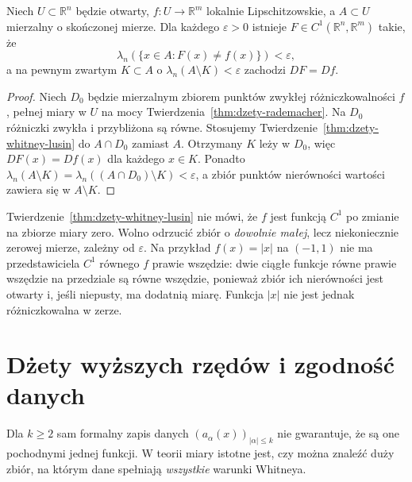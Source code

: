 \begin{wniosek}
\label{cor:dzety-lusin-lipschitz}
Niech $U\subset\mathbb R^n$ będzie otwarty,
$f:U\to\mathbb R^m$ lokalnie Lipschitzowskie,
a $A\subset U$ mierzalny o skończonej mierze.
Dla każdego $\varepsilon>0$ istnieje
$F\in C^1(\mathbb R^n,\mathbb R^m)$ takie, że
\[
 \lambda_n(\{x\in A:F(x)\ne f(x)\})<\varepsilon,
\]
a na pewnym zwartym $K\subset A$ o
$\lambda_n(A\setminus K)<\varepsilon$ zachodzi
$DF=Df$.
\end{wniosek}
\begin{proof}
Niech $D_0$ będzie mierzalnym zbiorem punktów
zwykłej różniczkowalności $f$, pełnej miary w $U$
na mocy Twierdzenia~\ref{thm:dzety-rademacher}.
Na $D_0$ różniczki zwykła i przybliżona są równe.
Stosujemy Twierdzenie~\ref{thm:dzety-whitney-lusin}
do $A\cap D_0$ zamiast $A$. Otrzymany $K$
leży w $D_0$, więc $DF(x)=Df(x)$ dla każdego
$x\in K$. Ponadto $\lambda_n(A\setminus K)
=\lambda_n((A\cap D_0)\setminus K)<\varepsilon$,
a zbiór punktów nierówności wartości zawiera się
w $A\setminus K$.
\end{proof}

\begin{uwaga}
Twierdzenie~\ref{thm:dzety-whitney-lusin} nie mówi,
że $f$ jest funkcją $C^1$ po zmianie na zbiorze miary zero.
Wolno odrzucić zbiór o \emph{dowolnie małej}, lecz niekoniecznie
zerowej mierze, zależny od $\varepsilon$.
Na przykład $f(x)=|x|$ na $(-1,1)$ nie ma
przedstawiciela $C^1$ równego $f$ prawie wszędzie:
dwie ciągłe funkcje równe prawie wszędzie na
przedziale są równe wszędzie, ponieważ zbiór
ich nierówności jest otwarty i, jeśli niepusty,
ma dodatnią miarę. Funkcja $|x|$ nie jest jednak
różniczkowalna w zerze.
\end{uwaga}

\section{Dżety wyższych rzędów i zgodność danych}
Dla $k\ge2$ sam formalny zapis danych
$(a_\alpha(x))_{|\alpha|\le k}$ nie gwarantuje,
że są one pochodnymi jednej funkcji. W teorii miary
istotne jest, czy można znaleźć duży zbiór, na którym
dane spełniają \emph{wszystkie} warunki Whitneya.

